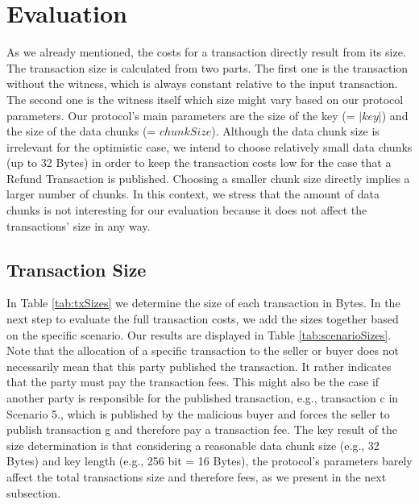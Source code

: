 \documentclass{cacthesis}
\newcounter{protocol}
\begin{document}
	    
	    \section{Evaluation}
	    \label{sub:eval}
	    As we already mentioned, the costs for a transaction directly result from its size. The transaction size is calculated from two parts. The first one is the transaction without the witness, which is always constant relative to the input transaction. The second one is the witness itself which size might vary based on our protocol parameters. Our protocol's main parameters are the size of the key (= $|key|$) and the size of the data chunks (= $chunkSize$). Although the data chunk size is irrelevant for the optimistic case, we intend to choose relatively small data chunks (up to 32 Bytes) in order to keep the transaction costs low for the case that a Refund Transaction is published. Choosing a smaller chunk size directly implies a larger number of chunks. In this context, we stress that the amount of data chunks is not interesting for our evaluation because it does not affect the transactions' size in any way. 
	    
	    \subsection{Transaction Size}
	    In Table \ref{tab:txSizes} we determine the size of each transaction in Bytes. In the next step to evaluate the full transaction costs, we add the sizes together based on the specific scenario. Our results are displayed in Table \ref{tab:scenarioSizes}. Note that the allocation of a specific transaction to the seller or buyer does not necessarily mean that this party published the transaction. It rather indicates that the party must pay the transaction fees. This might also be the case if another party is responsible for the published transaction, e.g., transaction c in Scenario 5., which is published by the malicious buyer and forces the seller to publish transaction g and therefore pay a transaction fee. The key result of the size determination is that considering a reasonable data chunk size (e.g., 32 Bytes) and key length (e.g., 256 bit = 16 Bytes), the protocol's parameters barely affect the total transactions size and therefore fees, as we present in the next subsection.
	    
\end{document}

